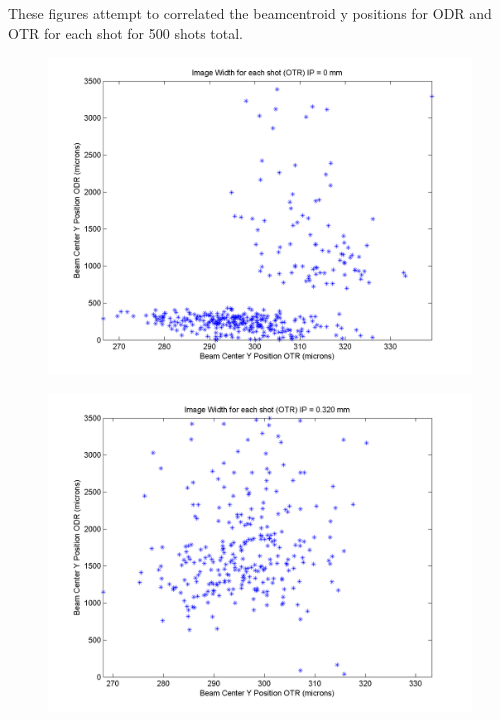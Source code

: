 \documentclass[12pt]{article}
\begin{document}
These figures attempt to correlated the beamcentroid y positions for ODR and OTR for each shot for 500 shots total.

\begin{figure}
\begin{center}
\includegraphics[scale=0.5]{Figures/YPosition_OTRODR_0.PNG}
\caption{}
\end{center}
\end{figure}

\begin{figure}
\begin{center}
\includegraphics[scale=0.5]{Figures/YPosition_OTRODR_320.PNG}
\caption{}
\end{center}
\end{figure}
\end{document}
